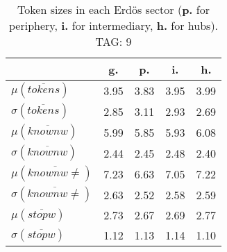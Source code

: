\begin{table}[h!]
\begin{center}
\begin{tabular}{| l | c | c | c | c |}\hline
 & g. & p. & i. & h. \\\hline
$\mu(\overline{tokens})$ & 3.95  & 3.83  & 3.95  & 3.99 \\\hline
$\sigma(\overline{tokens})$ & 2.85  & 3.11  & 2.93  & 2.69 \\\hline
$\mu(\overline{knownw})$ & 5.99  & 5.85  & 5.93  & 6.08 \\\hline
$\sigma(\overline{knownw})$ & 2.44  & 2.45  & 2.48  & 2.40 \\\hline
$\mu(\overline{knownw \neq})$ & 7.23  & 6.63  & 7.05  & 7.22 \\\hline
$\sigma(\overline{knownw \neq})$ & 2.63  & 2.52  & 2.58  & 2.59 \\\hline
$\mu(\overline{stopw})$ & 2.73  & 2.67  & 2.69  & 2.77 \\\hline
$\sigma(\overline{stopw})$ & 1.12  & 1.13  & 1.14  & 1.10 \\\hline
\end{tabular}
\caption{Token sizes in each Erd\"os sector ({{\bf p.}} for periphery, {{\bf i.}} for intermediary, {{\bf h.}} for hubs). TAG: 9}
\end{center}
\end{table}